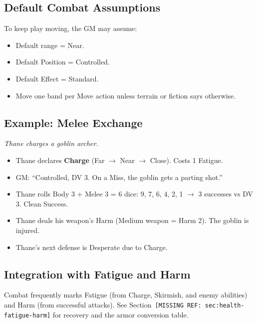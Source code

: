 \subsection{Default Combat Assumptions}

To keep play moving, the GM may assume:
\begin{itemize}
  \item Default range = Near.
  \item Default Position = Controlled.
  \item Default Effect = Standard.
  \item Move one band per Move action unless terrain or fiction says otherwise.
\end{itemize}

\subsection{Example: Melee Exchange}

\textit{Thane charges a goblin archer.}

\begin{itemize}
  \item Thane declares \textbf{Charge} (Far $\rightarrow$ Near $\rightarrow$ Close). Costs 1 Fatigue.
  \item GM: ``Controlled, DV 3. On a Miss, the goblin gets a parting shot.''
  \item Thane rolls Body 3 + Melee 3 = 6 dice: 9, 7, 6, 4, 2, 1 $\rightarrow$ 3 successes vs DV 3. Clean Success.
  \item Thane deals his weapon's Harm (Medium weapon = Harm 2). The goblin is injured.
  \item Thane's next defense is Desperate due to Charge.
\end{itemize}

\subsection{Integration with Fatigue and Harm}

Combat frequently marks Fatigue (from Charge, Skirmish, and enemy abilities) and Harm (from successful attacks). See Section~\texttt{[MISSING REF: sec:health-fatigue-harm]} for recovery and the armor conversion table.

